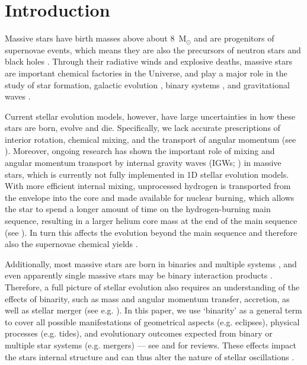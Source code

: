 \documentclass[fleqn,usenatbib]{mnras}
\begin{document}


\section{Introduction}

Massive stars have birth masses above about 8~M$_{\odot}$ and are progenitors of supernovae events, which means they are also the precursors of neutron stars and black holes \citep{Maeder2000, Kippenhahn2012, Langer2012}. Through their radiative winds and explosive deaths, massive stars are important chemical factories in the Universe, and play a major role in the study of star formation, galactic evolution \citep{Hopkins+2014}, binary systems \citep{Sana+2012, MarchantBodensteiner2024}, and gravitational waves \citep{Abbott+2016a}. 

Current stellar evolution models, however, have large uncertainties in how these stars are born, evolve and die. Specifically, we lack accurate prescriptions of interior rotation, chemical mixing, and the transport of angular momentum (see \citealt{Aerts2019_angmomReview}). Moreover, ongoing research has shown the important role of mixing and angular momentum transport by internal gravity waves (IGWs; \citealt{Rogers2015, Rogers+2017, Rogers2025, Varghese+2023, Varghese2025}) in massive stars, which is currently not fully implemented in 1D stellar evolution models. With more efficient internal mixing, unprocessed hydrogen is transported from the envelope into the core and made available for nuclear burning, which allows the star to spend a longer amount of time on the hydrogen-burning main sequence, resulting in a larger helium core mass at the end of the main sequence (see \citealt{Bowman_2020_review, Johnston2021}). In turn this affects the evolution beyond the main sequence and therefore also the supernovae chemical yields \citep{Maeder2000, Kippenhahn2012, Langer2012}.

Additionally, most massive stars are born in binaries and multiple systems \citep{Sana+2012}, and even apparently single massive stars may be binary interaction products \citep{Langer2012, MarchantBodensteiner2024}. Therefore, a full picture of stellar evolution also requires an understanding of the effects of binarity, such as mass and angular momentum transfer, accretion, as well as stellar merger (see e.g. \citealt{Renzo+2021,Richards+2025,Henneco+2024b}). In this paper, we use ‘binarity’ as a general term to cover all possible manifestations of geometrical aspects (e.g. eclipses), physical processes (e.g. tides), and evolutionary outcomes expected from binary or multiple star systems (e.g. mergers) --- see \citet{DeMarco+2017} and \citet{Schneider2025} for reviews. These effects impact the stars internal structure and can thus alter the nature of stellar oscillations \citep{Miszuda+2021,Wagg_2024}.
\end{document}
